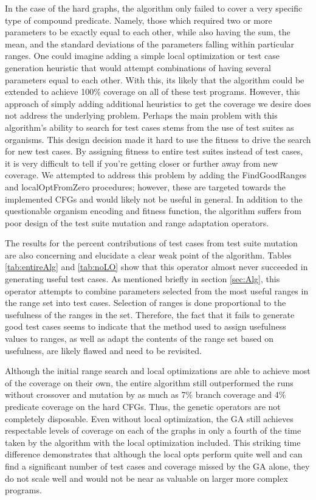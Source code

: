 \documentclass[runningheads]{llncs}
\begin{document}
In the case of the hard graphs, the algorithm only failed to cover a very specific type of compound predicate. Namely, those which required two or more parameters to be exactly equal to each other, while also having the sum, the mean, and the standard deviations of the parameters falling within particular ranges. One could imagine adding a simple local optimization or test case generation heuristic that would attempt combinations of having several parameters equal to each other. With this, its likely that the algorithm could be extended to achieve 100\% coverage on all of these test programs. However, this approach of simply adding additional heuristics to get the coverage we desire does not address the underlying problem. Perhaps the main problem with this algorithm's ability to search for test cases stems from the use of test suites as organisms. This design decision made it hard to use the fitness to drive the search for new test cases. By assigning fitness to entire test suites instead of test cases, it is very difficult to tell if you're getting closer or further away from new coverage. We attempted to address this problem by adding the FindGoodRanges and localOptFromZero procedures; however, these are targeted towards the implemented CFGs and would likely not be useful in general. In addition to the questionable organism encoding and fitness function, the algorithm suffers from poor design of the test suite mutation and range adaptation operators.

The results for the percent contributions of test cases from test suite mutation are also concerning and elucidate a clear weak point of the algorithm. Tables \ref{tab:entireAlg} and \ref{tab:noLO} show that this operator almost never succeeded in generating useful test cases. As mentioned briefly in section \ref{sec:Alg}, this operator attempts to combine parameters selected from the most useful ranges in the range set into test cases. Selection of ranges is done proportional to the usefulness of the ranges in the set. Therefore, the fact that it fails to generate good test cases seems to indicate that the method used to assign usefulness values to ranges, as well as adapt the contents of the range set based on usefulness, are likely flawed and need to be revisited.

Although the initial range search and local optimizations are able to achieve most of the coverage on their own, the entire algorithm still outperformed the runs without crossover and mutation by as much as 7\% branch coverage and 4\% predicate coverage on the hard CFGs. Thus, the genetic operators are not completely disposable. Even without local optimization, the GA still achieves respectable levels of coverage on each of the graphs in only a fourth of the time taken by the algorithm with the local optimization included. This striking time difference demonstrates that although the local opts perform quite well and can find a significant number of test cases and coverage missed by the GA alone, they do not scale well and would not be near as valuable on larger more complex programs. 
\end{document}
